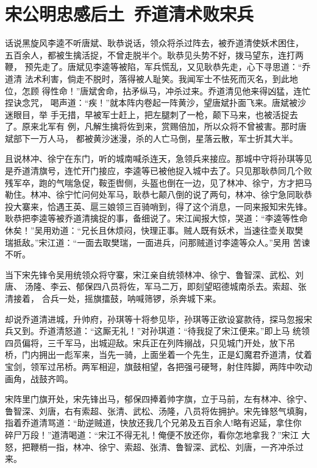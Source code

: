 \chapter{宋公明忠感后土~乔道清术败宋兵}

话说黑旋风李逵不听唐斌、耿恭说话，领众将杀过阵去，被乔道清使妖术困住，
五百余人，都被生擒活捉，不曾走脱半个。耿恭见头势不好，拨马望东，连打两鞭，
预先走了。唐斌见李逵等被陷，军兵慌乱，又见耿恭先走，心下寻思道：“乔道清
法术利害，倘走不脱时，落得被人耻笑。我闻军士不怯死而灭名，到此地位，怎顾
得性命！”唐斌舍命，拈矛纵马，冲杀过来。乔道清见他来得凶猛，连忙捏诀念咒，
喝声道：“疾！”就本阵内卷起一阵黄沙，望唐斌扑面飞来。唐斌被沙迷眼目，举
手无措，早被军士赶上，把左腿刺了一枪，颠下马来，也被活捉去了。原来北军有
例，凡解生擒将佐到来，赏赐倍加，所以众将不曾被害。那时唐斌部下一万人马，
都被黄沙迷漫，杀的人亡马倒，星落云散，军士折其大半。

且说林冲、徐宁在东门，听的城南喊杀连天，急领兵来接应。那城中守将孙琪等见
是乔道清旗号，连忙开门接应，李逵等已被他捉入城中去了。只见那耿恭同几个败
残军卒，跑的气喘急促，鞍歪辔侧，头盔也倒在一边，见了林冲、徐宁，方才把马
勒住。林冲、徐宁忙问何处军马，耿恭七颠八倒的说了两句，林冲、徐宁急同耿恭
投大寨来，恰遇王英、扈三娘领三百骑哨到，得了这个消息，一同来报知宋先锋。
耿恭把李逵等被乔道清擒捉的事，备细说了。宋江闻报大惊，哭道：“李逵等性命
休矣！”吴用劝道：“兄长且休烦闷，快理正事。贼人既有妖术，当速往壶关取樊
瑞抵敌。”宋江道：“一面去取樊瑞，一面进兵，问那贼道讨李逵等众人。”吴用
苦谏不听。

当下宋先锋令吴用统领众将守寨，宋江亲自统领林冲、徐宁、鲁智深、武松、刘唐、
汤隆、李云、郁保四八员将佐，军马二万，即刻望昭德城南杀去。索超、张清接着，
合兵一处，摇旗擂鼓，呐喊筛锣，杀奔城下来。

却说乔道清进城，升帅府，孙琪等十将参见毕，孙琪等正欲设宴款待，探马忽报宋
兵又到。乔道清怒道：“这厮无礼！”对孙琪道：“待我捉了宋江便来。”即上马
统领四员偏将，三千军马，出城迎敌。宋兵正在列阵搦战，只见城门开处，放下吊
桥，门内拥出一彪军来，当先一骑，上面坐着一个先生，正是幻魔君乔道清，仗着
宝剑，领军过吊桥。两军相迎，旗鼓相望，各把强弓硬弩，射住阵脚，两阵中吹动
画角，战鼓齐鸣。

宋阵里门旗开处，宋先锋出马，郁保四捧着帅字旗，立于马前，左有林冲、徐宁、
鲁智深、刘唐，右有索超、张清、武松、汤隆，八员将佐拥护。宋先锋怒气填胸，
指着乔道清骂道：“助逆贼道，快放还我几个兄弟及五百余人!略有迟延，拿住你
碎尸万段！”道清喝道：“宋江不得无礼！俺便不放还你，看你怎地拿我？”宋江
大怒，把鞭梢一指，林冲、徐宁、索超、张清、鲁智深、武松、刘唐，一齐冲杀过
来。

